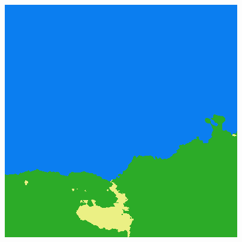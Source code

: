\begin{figure}
    \includegraphics[width=\UnetPredictionsImageWidth]{images/unet/unet-23D/82607-prediction}


\end{figure}
